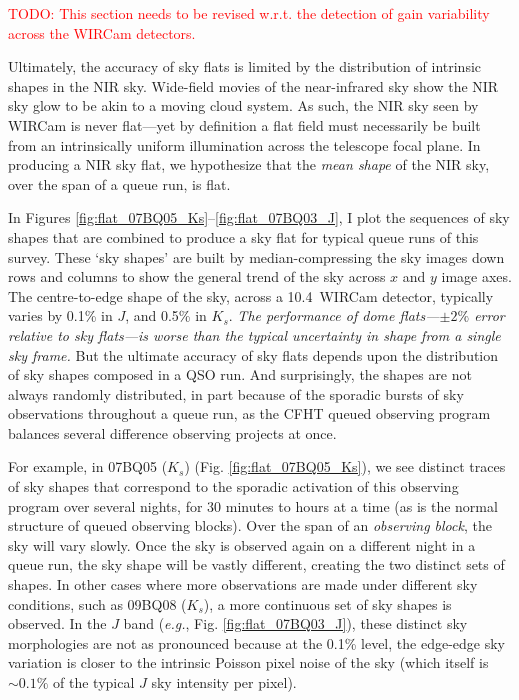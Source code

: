 \documentclass[iop]{emulateapj}
\newcommand{\eg}{\textit{e.g.}}
\newcommand{\changeit}[1]{\textcolor{red}{#1}} %
\begin{document}
\changeit{TODO: This section needs to be revised w.r.t. the detection of gain variability across the WIRCam detectors.}

Ultimately, the accuracy of sky flats is limited by the distribution of intrinsic shapes in the NIR sky. Wide-field movies of the near-infrared sky \citep{Adams:1996} show the NIR sky glow to be akin to a moving cloud system. As such, the NIR sky seen by WIRCam is never flat---yet by definition a flat field must necessarily be built from an intrinsically uniform illumination across the telescope focal plane. In producing a NIR sky flat, we hypothesize that the \emph{mean shape} of the NIR sky, over the span of a queue run, is flat.

In Figures \ref{fig:flat_07BQ05_Ks}--\ref{fig:flat_07BQ03_J}, I plot the sequences of sky shapes that are combined to produce a sky flat for typical queue runs of this survey. These `sky shapes' are built by median-compressing the sky images down rows and columns to show the general trend of the sky across $x$ and $y$ image axes. The centre-to-edge shape of the sky, across a 10.4\arcmin\ WIRCam detector, typically varies by 0.1\% in $J$, and 0.5\% in $K_s$. \emph{The performance of dome flats---$\pm2\%$ error relative to sky flats---is worse than the typical uncertainty in shape from a single sky frame.} But the ultimate accuracy of sky flats depends upon the distribution of sky shapes composed in a QSO run. And surprisingly, the shapes are not always randomly distributed, in part because of the sporadic bursts of sky observations throughout a queue run, as the CFHT queued observing program balances several difference observing projects at once.

For example, in 07BQ05 ($K_s$) (Fig. \ref{fig:flat_07BQ05_Ks}), we see distinct traces of sky shapes that correspond to the sporadic activation of this observing program over several nights, for 30 minutes to hours at a time (as is the normal structure of queued observing blocks). Over the span of an \emph{observing block}, the sky will vary slowly. Once the sky is observed again on a different night in a queue run, the sky shape will be vastly different, creating the two distinct sets of shapes. In other cases where more observations are made under different sky conditions, such as 09BQ08 ($K_s$), a more continuous set of sky shapes is observed. In the $J$ band (\eg, Fig. \ref{fig:flat_07BQ03_J}), these distinct sky morphologies are not as pronounced because at the 0.1\% level, the edge-edge sky variation is closer to the intrinsic Poisson pixel noise of the sky (which itself is $\sim 0.1\%$ of the typical $J$ sky intensity per pixel).
\end{document}
